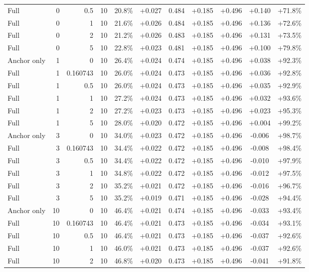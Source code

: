 \begin{table}[htbp]
\begin{tabular}{lrrrccccccc}
Full & 0 & 0.5 & 10 & 20.8\% & +0.027 & 0.484 & +0.185 & +0.496 & +0.140 & +71.8\% \\
Full & 0 & 1 & 10 & 21.6\% & +0.026 & 0.484 & +0.185 & +0.496 & +0.136 & +72.6\% \\
Full & 0 & 2 & 10 & 21.2\% & +0.026 & 0.483 & +0.185 & +0.496 & +0.131 & +73.5\% \\
Full & 0 & 5 & 10 & 22.8\% & +0.023 & 0.481 & +0.185 & +0.496 & +0.100 & +79.8\% \\
Anchor only & 1 & 0 & 10 & 26.4\% & +0.024 & 0.474 & +0.185 & +0.496 & +0.038 & +92.3\% \\
Full & 1 & 0.160743 & 10 & 26.0\% & +0.024 & 0.473 & +0.185 & +0.496 & +0.036 & +92.8\% \\
Full & 1 & 0.5 & 10 & 26.0\% & +0.024 & 0.473 & +0.185 & +0.496 & +0.035 & +92.9\% \\
Full & 1 & 1 & 10 & 27.2\% & +0.024 & 0.473 & +0.185 & +0.496 & +0.032 & +93.6\% \\
Full & 1 & 2 & 10 & 27.2\% & +0.023 & 0.473 & +0.185 & +0.496 & +0.023 & +95.3\% \\
Full & 1 & 5 & 10 & 28.0\% & +0.020 & 0.472 & +0.185 & +0.496 & +0.004 & +99.2\% \\
Anchor only & 3 & 0 & 10 & 34.0\% & +0.023 & 0.472 & +0.185 & +0.496 & -0.006 & +98.7\% \\
Full & 3 & 0.160743 & 10 & 34.4\% & +0.022 & 0.472 & +0.185 & +0.496 & -0.008 & +98.4\% \\
Full & 3 & 0.5 & 10 & 34.4\% & +0.022 & 0.472 & +0.185 & +0.496 & -0.010 & +97.9\% \\
Full & 3 & 1 & 10 & 34.8\% & +0.022 & 0.472 & +0.185 & +0.496 & -0.012 & +97.5\% \\
Full & 3 & 2 & 10 & 35.2\% & +0.021 & 0.472 & +0.185 & +0.496 & -0.016 & +96.7\% \\
Full & 3 & 5 & 10 & 35.2\% & +0.019 & 0.471 & +0.185 & +0.496 & -0.028 & +94.4\% \\
Anchor only & 10 & 0 & 10 & 46.4\% & +0.021 & 0.474 & +0.185 & +0.496 & -0.033 & +93.4\% \\
Full & 10 & 0.160743 & 10 & 46.4\% & +0.021 & 0.473 & +0.185 & +0.496 & -0.034 & +93.1\% \\
Full & 10 & 0.5 & 10 & 46.4\% & +0.021 & 0.473 & +0.185 & +0.496 & -0.037 & +92.6\% \\
Full & 10 & 1 & 10 & 46.0\% & +0.021 & 0.473 & +0.185 & +0.496 & -0.037 & +92.6\% \\
Full & 10 & 2 & 10 & 46.8\% & +0.020 & 0.473 & +0.185 & +0.496 & -0.041 & +91.8\% \\

\end{tabular}
\end{table}

